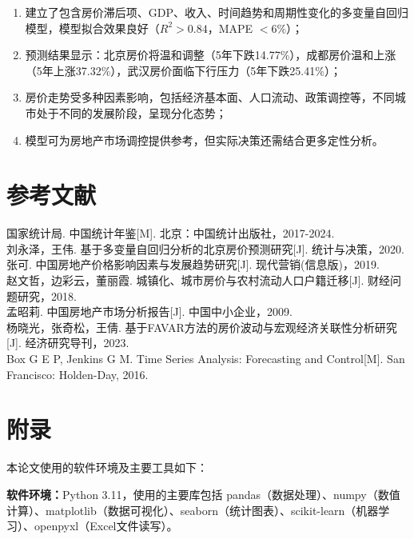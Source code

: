 \documentclass[12pt,a4paper]{article}
\begin{document}
\begin{enumerate}
    \item 建立了包含房价滞后项、GDP、收入、时间趋势和周期性变化的多变量自回归模型，模型拟合效果良好（$R^2 > 0.84$，MAPE $< 6\%$）；
    
    \item 预测结果显示：北京房价将温和调整（5年下跌14.77\%），成都房价温和上涨（5年上涨37.32\%），武汉房价面临下行压力（5年下跌25.41\%）；
    
    \item 房价走势受多种因素影响，包括经济基本面、人口流动、政策调控等，不同城市处于不同的发展阶段，呈现分化态势；
    
    \item 模型可为房地产市场调控提供参考，但实际决策还需结合更多定性分析。
\end{enumerate}

\section*{参考文献}

\begin{flushleft}
\noindent [1] 国家统计局. 中国统计年鉴[M]. 北京：中国统计出版社，2017-2024.\\
\noindent [2] 刘永泽，王伟. 基于多变量自回归分析的北京房价预测研究[J]. 统计与决策，2020.\\
\noindent [3] 张可. 中国房地产价格影响因素与发展趋势研究[J]. 现代营销(信息版)，2019.\\
\noindent [4] 赵文哲，边彩云，董丽霞. 城镇化、城市房价与农村流动人口户籍迁移[J]. 财经问题研究，2018.\\
\noindent [5] 孟昭莉. 中国房地产市场分析报告[J]. 中国中小企业，2009.\\
\noindent [6] 杨晓光，张奇松，王倩. 基于FAVAR方法的房价波动与宏观经济关联性分析研究[J]. 经济研究导刊，2023.\\
\noindent [7] Box G E P, Jenkins G M. Time Series Analysis: Forecasting and Control[M]. San Francisco: Holden-Day, 2016.
\end{flushleft}

\section*{附录}

本论文使用的软件环境及主要工具如下：

\textbf{软件环境：}Python 3.11，使用的主要库包括 pandas（数据处理）、numpy（数值计算）、matplotlib（数据可视化）、seaborn（统计图表）、scikit-learn（机器学习）、openpyxl（Excel文件读写）。
\end{document}
